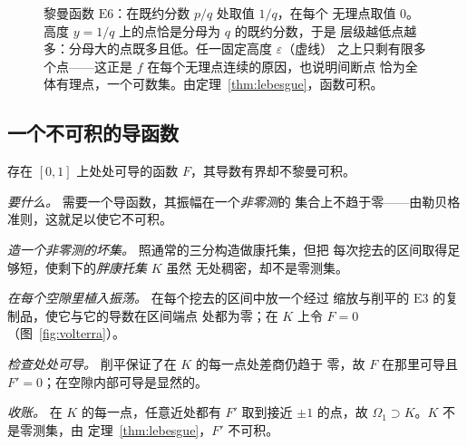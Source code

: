 \begin{figure}[htbp]
\caption{黎曼函数 $\mathrm{E}6$：在既约分数 $p/q$ 处取值 $1/q$，在每个
无理点取值 $0$。高度 $y=1/q$ 上的点恰是分母为 $q$ 的既约分数，于是
层级越低点越多：分母大的点既多且低。任一固定高度 $\varepsilon$（虚线）
之上只剩有限多个点——这正是 $f$ 在每个无理点连续的原因，也说明间断点
恰为全体有理点，一个可数集。由定理~\ref{thm:lebesgue}，函数可积。}
\label{fig:thomae}
\end{figure}

\subsection{一个不可积的导函数}

\begin{theorem}[沃尔泰拉]\label{thm:volterra}
存在 $[0,1]$ 上处处可导的函数 $F$，其导数有界却不黎曼可积。
\end{theorem}

\begin{flow}[构造的脉络]
  \item \textit{要什么。} 需要一个导函数，其振幅在一个\emph{非零测}的
        集合上不趋于零——由勒贝格准则，这就足以使它不可积。
  \item \textit{造一个非零测的坏集。} 照通常的三分构造做康托集，但把
        每次挖去的区间取得足够短，使剩下的\emph{胖康托集} $K$ 虽然
        无处稠密，却不是零测集。
  \item \textit{在每个空隙里植入振荡。} 在每个挖去的区间中放一个经过
        缩放与削平的 $\mathrm{E}3$ 的复制品，使它与它的导数在区间端点
        处都为零；在 $K$ 上令 $F=0$（图~\ref{fig:volterra}）。
  \item \textit{检查处处可导。} 削平保证了在 $K$ 的每一点处差商仍趋于
        零，故 $F$ 在那里可导且 $F'=0$；在空隙内部可导是显然的。
  \item \textit{收账。} 在 $K$ 的每一点，任意近处都有 $F'$ 取到接近
        $\pm1$ 的点，故 $\Omega_1 \supset K$。$K$ 不是零测集，由
        定理~\ref{thm:lebesgue}，$F'$ 不可积。
\end{flow}

